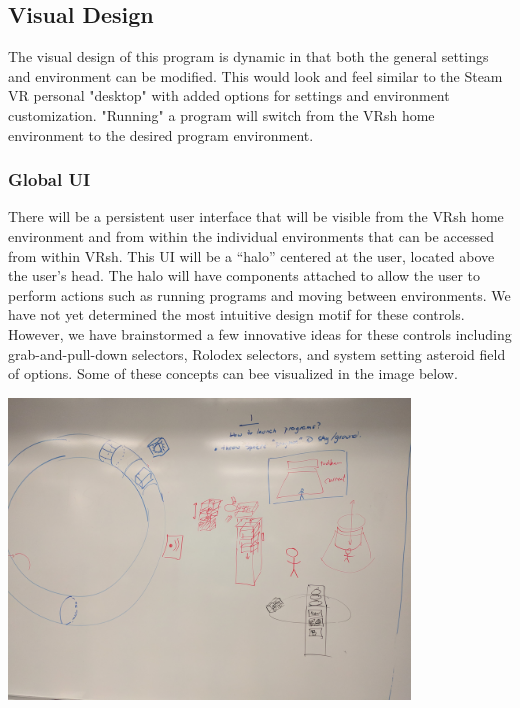 \documentclass[titlepage,12pt]{article}
\newcommand\name{VRsh}
\begin{document}
\subsection{Visual Design}
The visual design of this program is dynamic in that both the general
settings and environment can be modified. This would look and feel
similar to the Steam VR personal "desktop" with added options for settings
and environment customization. "Running" a program will switch from the {\name}
home environment to the desired program environment.

\subsubsection{Global UI}\label{sec:ui}
There will be a persistent user interface that will be visible from the {\name}
home environment and from within the individual environments that can be
accessed from within \name. This UI will be a ``halo'' centered at the user,
located above the user's head. The halo will have components attached to allow
the user to perform actions such as running programs and moving between
environments. We have not yet determined the most intuitive design motif for
these controls. However, we have brainstormed a few innovative ideas for these
controls including grab-and-pull-down selectors, Rolodex selectors, and system
setting asteroid field of options. Some of these concepts can bee visualized in
the image below.

\begin{center}
    \includegraphics[width=0.8\textwidth]{./images/visual.jpg}
\end{center}
\end{document}
